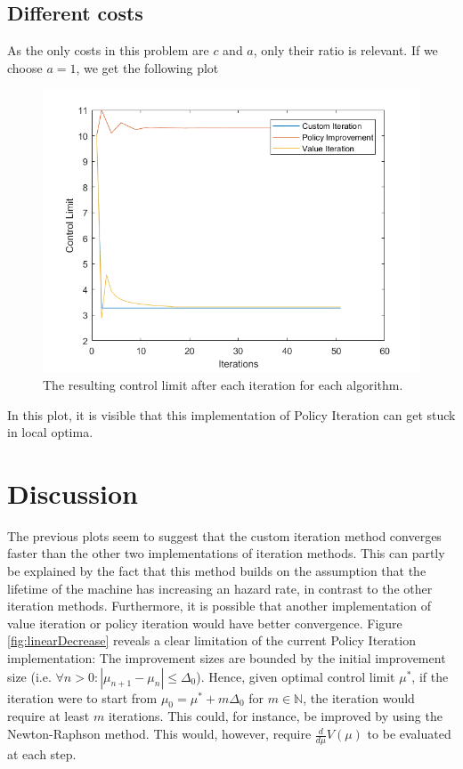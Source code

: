 \subsection{Different costs}
As the only costs in this problem are $c$ and $a$, only their ratio is relevant.
If we choose $a=1$, we get the following plot
\begin{figure}[H]
\centering
\includegraphics[width=\textwidth]{Plots/CL Weibull2-2 Discount-1 Start-1 a-1.png}
\caption{The resulting control limit after each iteration for each algorithm.}
\end{figure}
In this plot, it is visible that this implementation of Policy Iteration can get stuck in local optima.

\section{Discussion}
The previous plots seem to suggest that the custom iteration method converges faster than the other two implementations of iteration methods.
This can partly be explained by the fact that this method builds on the assumption that the lifetime of the machine has increasing an hazard rate, in contrast to the other iteration methods.
Furthermore, it is possible that another implementation of value iteration or policy iteration would have better convergence.
Figure \ref{fig:linearDecrease} reveals a clear limitation of the current Policy Iteration implementation:
The improvement sizes are bounded by the initial improvement size (i.e. $\forall n>0: |\mu_{n+1}-\mu_n|\leq \Delta_0$).
Hence, given optimal control limit $\mu^*$, if the iteration were to start from $\mu_0=\mu^*+m\Delta_0$ for $m\in\mathbb{N}$, the iteration would require at least $m$ iterations.
This could, for instance, be improved by using the Newton-Raphson method.
This would, however, require $\frac{d}{d\mu}V(\mu)$ to be evaluated at each step.
